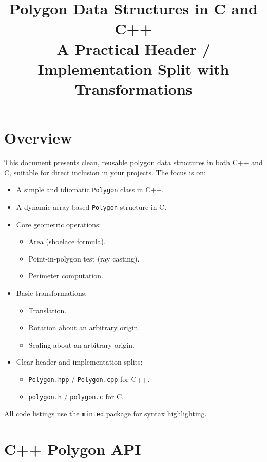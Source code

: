 \documentclass[11pt,a4paper]{article}
\title{Polygon Data Structures in C and C++\\[0.2em]\large A Practical Header / Implementation Split with Transformations}
\author{}
\date{}
\begin{document}
\maketitle

\section{Overview}

This document presents clean, reusable polygon data structures in both C++ and C, suitable for direct inclusion in your projects.
The focus is on:

\begin{itemize}[leftmargin=*]
  \item A simple and idiomatic \texttt{Polygon} class in C++.
  \item A dynamic-array-based \texttt{Polygon} structure in C.
  \item Core geometric operations:
        \begin{itemize}
          \item Area (shoelace formula).
          \item Point-in-polygon test (ray casting).
          \item Perimeter computation.
        \end{itemize}
  \item Basic transformations:
        \begin{itemize}
          \item Translation.
          \item Rotation about an arbitrary origin.
          \item Scaling about an arbitrary origin.
        \end{itemize}
  \item Clear header and implementation splits:
        \begin{itemize}
          \item \texttt{Polygon.hpp} / \texttt{Polygon.cpp} for C++.
          \item \texttt{polygon.h} / \texttt{polygon.c} for C.
        \end{itemize}
\end{itemize}

All code listings use the \texttt{minted} package for syntax highlighting.

\clearpage

\section{C++ Polygon API}
\end{document}
